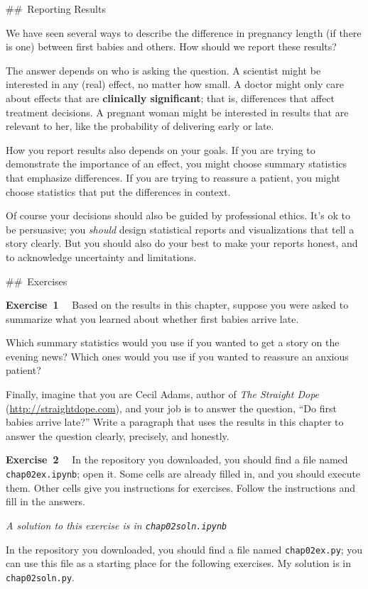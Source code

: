 \documentclass[]{book}
\begin{document}
\#\#~Reporting Results

We have seen several ways to describe the
difference in pregnancy length (if there is one) between first babies
and others. How should we report these results?

The answer depends on who is asking the
question. A scientist might be interested in any (real) effect, no
matter how small. A doctor might only care about effects that are \textbf{clinically significant}; that is,
differences that affect treatment decisions. A pregnant woman might be
interested in results that are relevant to her, like the probability of
delivering early or late.

How you report results also depends on
your goals. If you are trying to demonstrate the importance of an
effect, you might choose summary statistics that emphasize differences.
If you are trying to reassure a patient, you might choose statistics
that put the differences in context.

Of course your decisions should also be
guided by professional ethics. It's ok to be persuasive; you \emph{should}
design statistical reports and visualizations that tell a story clearly.
But you should also do your best to make your reports honest, and to
acknowledge uncertainty and limitations.

\#\#~Exercises

\textbf{Exercise~1}~~
Based on the results in this chapter, suppose you were asked to summarize what you learned about
whether first babies arrive late.

Which summary statistics would you use
if you wanted to get a story on the evening news? Which ones would you
use if you wanted to reassure an anxious patient?

Finally, imagine that you are Cecil Adams, author of \emph{The Straight
Dope} (\url{http://straightdope.com}), and your job is to answer the question, ``Do
first babies arrive late?'' Write a paragraph that uses the results in
this chapter to answer the question clearly, precisely, and honestly.

\textbf{Exercise~2}~~
In the repository you downloaded, you should find a file named \texttt{chap02ex.ipynb}; open it. Some
cells are already filled in, and you should execute them. Other cells
give you instructions for exercises. Follow the instructions and fill in
the answers.

\emph{A solution to this exercise is in \texttt{chap02soln.ipynb}}

In the repository you downloaded, you
should find a file named \texttt{chap02ex.py}; you can use this file as a
starting place for the following exercises. My solution is in
\texttt{chap02soln.py}.
\end{document}
